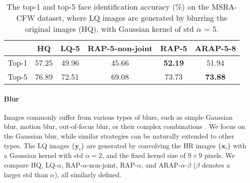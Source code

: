 \documentclass[10pt,twocolumn,twoside]{IEEEtran} %
\begin{document}
\begin{table}
	\label{msrasalt}
\end{table}\begin{table}
	\fontsize{10pt}{12pt}\selectfont
	\caption{The top-1 and top-5 face identification accuracy (\%) on the MSRA-CFW dataset, where LQ images are generated by blurring the original images (HQ), with Gaussian kernel of std $\alpha$ = 5.}
	\begin{center}
		\begin{tabular}{@{\hskip 1mm}c@{\hskip 1mm}|@{\hskip 1mm}c@{\hskip 1mm}|@{\hskip 1mm}c@{\hskip 1mm}|@{\hskip 1mm}c@{\hskip 1mm}|@{\hskip 1mm}c@{\hskip 1mm}|@{\hskip 1mm}c@{\hskip 1mm}}
			\hline
			& HQ & LQ-5 & RAP-5-non-joint & RAP-5 & ARAP-5-8 \\ \hline
			\hline
			Top-1  & 57.25 & 49.96 & 45.66 & \textbf{52.19} & 51.94\\ 
			Top-5  & 76.89 & 72.51 & 69.08 & 73.73 & \textbf{73.88}\\ \hline
		\end{tabular}
	\end{center}
	
	\label{msrablur}
\end{table}\paragraph{Blur}%
Images commonly suffer from various types of blurs, such as simple Gaussian blur, motion blur, out-of-focus blur, or their complex combinations \cite{zhang2011close}. We focus on the Gaussian blur, while similar strategies can be naturally extended to other types. The LQ images $\{\mathbf{y}_i\}$ are generated by convolving the HR images $\{\mathbf{x}_i\}$ with a Gaussian kernel with std $\alpha = 2$, and the fixed kernel size of $9\times9$ pixels. We compare HQ, LQ-$\alpha$, RAP-$\alpha$-non-joint, RAP-$\alpha$, and ARAP-$\alpha$-$\beta$ ($\beta$ denotes a larger std than $\alpha$), all similarly defined. 
\end{document}
